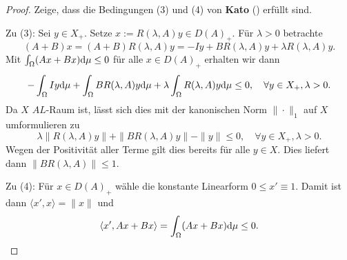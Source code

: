 \begin{proof}
\par
Zeige, dass  die Bedingungen (3) und (4) von \textbf{Kato} () erfüllt sind.

\par






\par
Zu (3): Sei $y\in X_+$. Setze $x:=R(\lambda, A)y\in D(A)_+$. Für $\lambda>0$ betrachte
\begin{equation*}
(A+B)x=(A+B)R(\lambda, A)y=-Iy+BR(\lambda, A)y+\lambda R(\lambda, A)y.
\end{equation*}
Mit $\int_\Omega (Ax+Bx)\textnormal d\mu\leq 0$ für alle $x\in D(A)_+$ erhalten wir dann
\begin{equation*}
-\int_\Omega Iy\textnormal d\mu + \int_\Omega BR(\lambda, A)y\textnormal d\mu + \lambda \int_\Omega R(\lambda, A)y\textnormal d\mu\leq 0,\quad\forall y\in X_+,\lambda>0.
\end{equation*}
Da $X$ $AL$-Raum ist, lässt sich dies mit der kanonischen Norm $\|\cdot\|_1$ auf $X$ umformulieren zu
\begin{equation*}
\lambda \|R(\lambda, A)y\| + \|BR(\lambda, A)y\| - \|y\|\leq 0,\quad\forall y\in X_+,\lambda >0.
\end{equation*}
Wegen der Positivität aller Terme gilt dies bereits für alle $y\in X$. Dies liefert dann  $\|BR(\lambda, A)\|\leq 1$.
\par
Zu (4): Für $x\in D(A)_+$ wähle die konstante Linearform $0\leq x'\equiv 1$. Damit ist dann $\langle x',x\rangle = \|x\|$ und
\begin{equation*}
    \langle x', Ax+Bx\rangle =\int_\Omega (Ax+Bx)\textnormal d\mu\leq0.
\end{equation*}
\end{proof}

